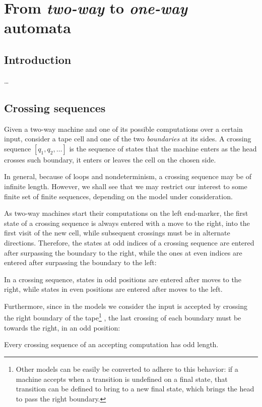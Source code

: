 \chapter{From \emph{two-way} to \emph{one-way} automata}



\section{Introduction}
\dots


\section{Crossing sequences}
Given a two-way machine and one of its possible computations over a certain input, consider a tape cell and one of the two \emph{boundaries} at its sides.
A crossing sequence $[q_1,q_2,\dots]$ is the sequence of states that the machine enters as the head crosses such boundary, \ie it enters or leaves the cell on the chosen side.

In general, because of loops and nondeterminism, a crossing sequence may be of infinite length.
However, we shall see that we may restrict our interest to some finite set of finite sequences, depending on the model under consideration.

As two-way machines start their computations on the left end-marker, the first state of a crossing sequence is always entered with a move to the right, into the first visit of the new cell, while subsequent crossings must be in alternate directions.
Therefore, the states at odd indices of a crossing sequence are entered after surpassing the boundary to the right, while the ones at even indices are entered after surpassing the boundary to the left:
\begin{fact}\label{fact:crossing-parity}
	In a crossing sequence, states in odd positions are entered after moves to the right, while states in even positions are entered after moves to the left.
\end{fact}

Furthermore, since in the models we consider the input is accepted by crossing the right boundary of the tape\footnote{%
	Other models can be easily be converted to adhere to this behavior: if a machine accepts when a transition is undefined on a final state, that transition can be defined to bring to a new final state, which brings the head to pass the right boundary.}%
, the last crossing of each boundary must be towards the right, \ie in an odd position:
\begin{fact}\label{fact:crossing-length}
	Every crossing sequence of an accepting computation has odd length.
\end{fact}



